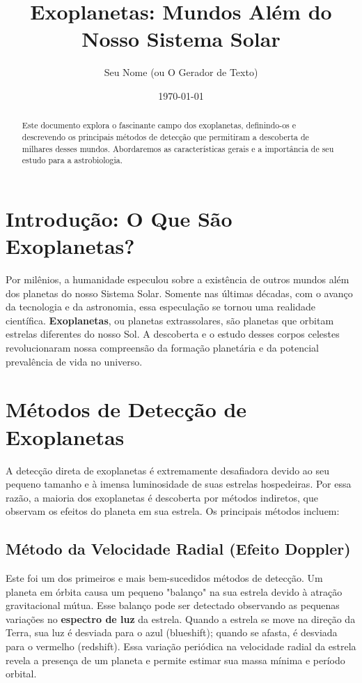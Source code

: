 \documentclass{article}
\title{Exoplanetas: Mundos Além do Nosso Sistema Solar}
\author{Seu Nome (ou O Gerador de Texto)}
\date{\today}
\begin{document}
\maketitle

\begin{abstract}
Este documento explora o fascinante campo dos exoplanetas, definindo-os e descrevendo os principais métodos de detecção que permitiram a descoberta de milhares desses mundos. Abordaremos as características gerais e a importância de seu estudo para a astrobiologia.
\end{abstract}

\section{Introdução: O Que São Exoplanetas?}
Por milênios, a humanidade especulou sobre a existência de outros mundos além dos planetas do nosso Sistema Solar. Somente nas últimas décadas, com o avanço da tecnologia e da astronomia, essa especulação se tornou uma realidade científica. \textbf{Exoplanetas}, ou planetas extrassolares, são planetas que orbitam estrelas diferentes do nosso Sol. A descoberta e o estudo desses corpos celestes revolucionaram nossa compreensão da formação planetária e da potencial prevalência de vida no universo.

\section{Métodos de Detecção de Exoplanetas}
A detecção direta de exoplanetas é extremamente desafiadora devido ao seu pequeno tamanho e à imensa luminosidade de suas estrelas hospedeiras. Por essa razão, a maioria dos exoplanetas é descoberta por métodos indiretos, que observam os efeitos do planeta em sua estrela. Os principais métodos incluem:

\subsection{Método da Velocidade Radial (Efeito Doppler)}
Este foi um dos primeiros e mais bem-sucedidos métodos de detecção. Um planeta em órbita causa um pequeno "balanço" na sua estrela devido à atração gravitacional mútua. Esse balanço pode ser detectado observando as pequenas variações no \textbf{espectro de luz} da estrela. Quando a estrela se move na direção da Terra, sua luz é desviada para o azul (blueshift); quando se afasta, é desviada para o vermelho (redshift). Essa variação periódica na velocidade radial da estrela revela a presença de um planeta e permite estimar sua massa mínima e período orbital.
\end{document}
